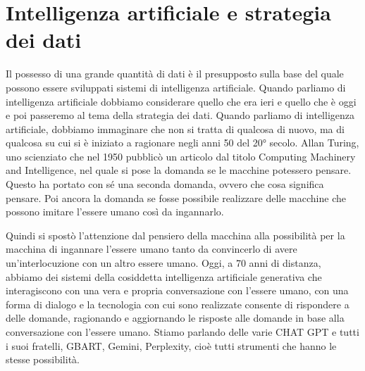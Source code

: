 \chapter{Intelligenza artificiale e strategia dei dati}

Il possesso di una grande quantità di dati è il presupposto sulla base del quale possono essere sviluppati sistemi di intelligenza artificiale.
Quando parliamo di intelligenza artificiale dobbiamo considerare quello che era ieri e quello che è oggi e poi passeremo al tema della strategia dei dati.
Quando parliamo di intelligenza artificiale, dobbiamo immaginare che non si tratta di qualcosa di nuovo, ma di qualcosa su cui si è iniziato a ragionare negli anni 50 del 20° secolo.
Allan Turing, uno scienziato che nel 1950 pubblicò un articolo dal titolo Computing Machinery and Intelligence, nel quale si pose la domanda se le macchine potessero pensare.
Questo ha portato con sé una seconda domanda, ovvero che cosa significa pensare.
Poi ancora la domanda se fosse possibile realizzare delle macchine che possono imitare l'essere umano così da ingannarlo.

Quindi si spostò l'attenzione dal pensiero della macchina alla possibilità per la macchina di ingannare l'essere umano tanto da convincerlo di avere un'interlocuzione con un altro essere umano.
Oggi, a 70 anni di distanza, abbiamo dei sistemi della cosiddetta intelligenza artificiale generativa che interagiscono con una vera e propria conversazione con l'essere umano, con una forma di dialogo e la tecnologia con cui sono realizzate consente di rispondere a delle domande, ragionando e aggiornando le risposte alle domande in base alla conversazione con l'essere umano.
Stiamo parlando delle varie CHAT GPT e tutti i suoi fratelli, GBART, Gemini, Perplexity, cioè tutti strumenti che hanno le stesse possibilità.

